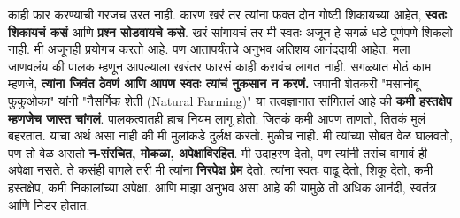 काही फार करण्याची गरजच उरत नाही. कारण खरं तर त्यांना फक्त दोन गोष्टी शिकायच्या आहेत,  \textbf{स्वतः शिकायचं कसं} आणि \textbf{प्रश्न सोडवायचे कसे}.
खरं सांगायचं तर मी स्वतः अजून हे सगळं धडे पूर्णपणे शिकलो नाही. मी अजूनही प्रयोगच करतो आहे. पण आतापर्यंतचे अनुभव अतिशय आनंददायी आहेत.
मला जाणवलंय की पालक म्हणून आपल्याला खरंतर फारसं काही करावंच लागत नाही. सगळ्यात मोठं काम म्हणजे,  \textbf{त्यांना जिवंत ठेवणं आणि आपण स्वतः त्यांचं नुकसान न करणं.}
जपानी शेतकरी "मसानोबू फुकुओका" यांनी "नैसर्गिक शेती (Natural Farming)" या तत्वज्ञानात सांगितलं आहे की
 \textbf{कमी हस्तक्षेप म्हणजेच जास्त चांगलं}. पालकत्वातही हाच नियम लागू होतो. जितकं कमी आपण ताणतो,
 तितकं मुलं बहरतात.
याचा अर्थ असा नाही की मी मुलांकडे दुर्लक्ष करतो. मुळीच नाही. मी त्यांच्या सोबत वेळ घालवतो, पण तो वेळ असतो \textbf{न-संरचित, मोकळा, अपेक्षाविरहित}. मी उदाहरण देतो, पण त्यांनी तसंच वागावं ही अपेक्षा नसते.
 ते कसंही वागले तरी मी त्यांना \textbf{निरपेक्ष प्रेम} देतो. त्यांना स्वतः वाढू देतो, शिकू देतो, कमी हस्तक्षेप, कमी निकालांच्या अपेक्षा.
आणि माझा अनुभव असा आहे की यामुळे ती अधिक आनंदी, स्वतंत्र आणि निडर होतात.
